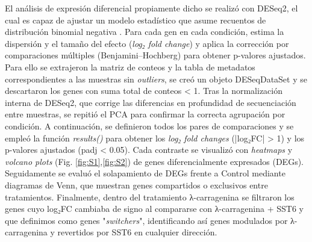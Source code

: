 \documentclass[10pt,a4paper]{article}
\begin{document}
El análisis de expresión diferencial propiamente dicho se realizó con DESeq2, el cual es capaz de ajustar un modelo estadístico que asume recuentos de distribución binomial negativa \parencite{Love2014}. Para cada gen en cada condición, estima la dispersión y el tamaño del efecto (\textit{log₂ fold change}) y aplica la corrección por comparaciones múltiples (Benjamini–Hochberg) para obtener p-valores ajustados. Para ello se extrajeron la matriz de conteos y la tabla de metadatos correspondientes a las muestras sin \textit{outliers}, se creó un objeto DESeqDataSet y se descartaron los genes con suma total de conteos < 1. Tras la normalización interna de DESeq2, que corrige las diferencias en profundidad de secuenciación entre muestras, se repitió el PCA para confirmar la correcta agrupación por condición. A continuación, se definieron todos los pares de comparaciones y se empleó la función \textit{results()} para obtener los \textit{log₂ fold changes} (|log₂FC| > 1) y los p-valores ajustados (padj < 0.05). Cada contraste se visualizó con \textit{heatmaps} y \textit{volcano plots} (Fig. \ref{fig:S1},\ref{fig:S2}) de genes diferencialmente expresados (DEGs). Seguidamente se evaluó el solapamiento de DEGs frente a Control mediante diagramas de Venn, que muestran genes compartidos o exclusivos entre tratamientos. Finalmente, dentro del tratamiento λ-carragenina se filtraron los genes cuyo log₂FC cambiaba de signo al compararse con λ-carragenina + SST6 y que definimos como genes "\textit{switchers}", identificando así genes modulados por λ-carragenina y revertidos por SST6 en cualquier dirección.
\end{document}
